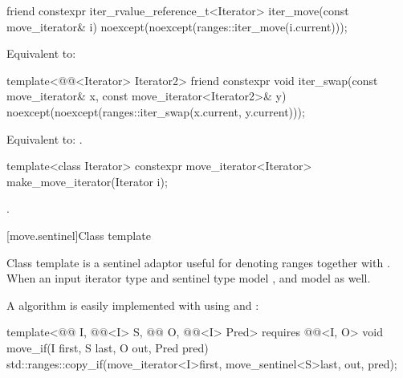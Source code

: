 %
\begin{itemdecl}
friend constexpr iter_rvalue_reference_t<Iterator>
  iter_move(const move_iterator& i)
    noexcept(noexcept(ranges::iter_move(i.current)));
\end{itemdecl}

\begin{itemdescr}
\pnum
\effects
Equivalent to: 
\end{itemdescr}

%
\begin{itemdecl}
template<@@<Iterator> Iterator2>
  friend constexpr void
    iter_swap(const move_iterator& x, const move_iterator<Iterator2>& y)
      noexcept(noexcept(ranges::iter_swap(x.current, y.current)));
\end{itemdecl}

\begin{itemdescr}
\pnum
\effects
Equivalent to: .
\end{itemdescr}

%
\begin{itemdecl}
template<class Iterator>
constexpr move_iterator<Iterator> make_move_iterator(Iterator i);
\end{itemdecl}

\begin{itemdescr}
\pnum
\returns
{}.
\end{itemdescr}

[move.sentinel]{Class template }

\pnum
Class template  is a sentinel adaptor useful for denoting
ranges together with . When an input iterator type
 and sentinel type  model ,
 and  model
 as well.

\pnum
\begin{example}
A  algorithm is easily implemented with
 using  and :
\begin{codeblock}
template<@@ I, @@<I> S, @@ O,
         @@<I> Pred>
  requires @@<I, O>
void move_if(I first, S last, O out, Pred pred) {
  std::ranges::copy_if(move_iterator<I>{first}, move_sentinel<S>{last}, out, pred);
}
\end{codeblock}
\end{example}

